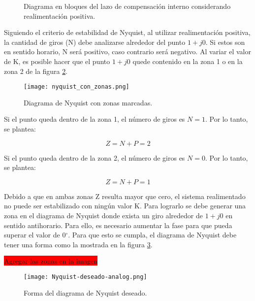 \begin{figure}[H]
	\centering
	
	\caption{Diagrama en bloques del lazo de compensación interno considerando realimentación positiva.}	\label{fig:diag-interno_realimentacion_positiva}
\end{figure}

Siguiendo el criterio de estabilidad de Nyquist, al utilizar realimentación positiva, la cantidad de giros (N) debe analizarse alrededor del punto $1+j0$. Si estos son en sentido horario, N será positivo, caso contrario será negativo. Al variar el valor de K, es posible hacer que el punto $1+j0$ quede contenido en la zona 1 o en la zona 2 de la figura \ref{fig:nyquist-con-zonas}. 

\begin{figure}[H]
	\centering
	\texttt{[image: nyquist\_con\_zonas.png]}
	\caption{Diagrama de Nyquist con zonas marcadas.}	
	\label{fig:nyquist-con-zonas}
\end{figure}

Si el punto queda dentro de la zona 1, el número de giros es $N=1$. Por lo tanto, se plantea:

\begin{equation*}
	Z = N + P = 2
\end{equation*}


Si el punto queda dentro de la zona 2, el número de giros es $N=0$. Por lo tanto, se plantea:

\begin{equation*}
	Z = N + P = 1
\end{equation*}

Debido a que en ambas zonas Z resulta mayor que cero, el sistema realimentado no puede ser estabilizado con ningún valor K. Para lograrlo se debe generar una zona en el diagrama de Nyquist donde exista un giro alrededor de $1 + j0$ en sentido antihorario. Para ello, es necesario aumentar la fase para que pueda superar el valor de 0$\mathrm{{}^\circ}$.  Para que esto se cumpla, el diagrama de Nyquist debe tener una forma como la  mostrada en la figura \ref{fig:nyquist-deseado-analog}.

\colorbox{red}{Agregar las zonas en la imagen}

\begin{figure}[H]
	\centering
	\texttt{[image: Nyquist-deseado-analog.png]}
	\caption{Forma del diagrama de Nyquist deseado.}
	\label{fig:nyquist-deseado-analog}
\end{figure}

